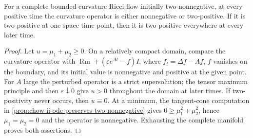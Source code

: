 \begin{proposition}
  \label{prop:chow-ii-strong-two-nonnegative-alternative}
  For a complete bounded-curvature Ricci flow initially two-nonnegative, at
  every positive time the curvature operator is either nonnegative or
  two-positive.  If it is two-positive at one space-time point, then it is
  two-positive everywhere at every later time.
\end{proposition}
\begin{proof}
  Let \(u=\mu_1+\mu_2\ge0\).  On a relatively compact domain, compare the
  curvature operator with
  \(\operatorname{Rm}+(\varepsilon e^{At}-f)I\), where
  \(f_t=\Delta f-Af\), \(f\) vanishes on the boundary, and its initial value
  is nonnegative and positive at the given point.  For \(A\) large the
  perturbed operator is a strict supersolution; the tensor maximum principle
  and then \(\varepsilon\downarrow0\) give \(u>0\) throughout the domain at
  later times.  If two-positivity never occurs, then \(u\equiv0\).  At a
  minimum, the tangent-cone computation in
  \ref{prop:chow-ii-ode-preserves-two-nonnegative} gives
  \(0\ge\mu_1^2+\mu_2^2\), hence \(\mu_1=\mu_2=0\) and the operator is
  nonnegative.  Exhausting the complete manifold proves both assertions.
\end{proof}

